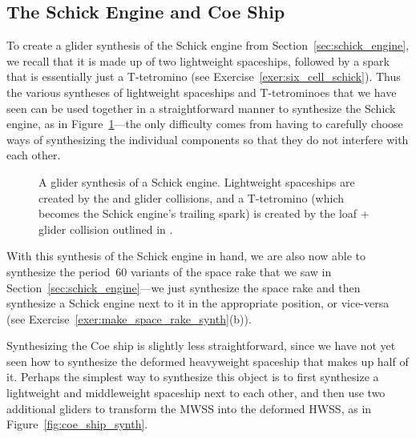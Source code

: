 \subsection{The Schick Engine and Coe Ship}\label{sec:incremental_schick}

To create a glider synthesis of the Schick engine from Section~\ref{sec:schick_engine}, we recall that it is made up of two lightweight spaceships, followed by a spark that is essentially just a T-tetromino (see Exercise~\ref{exer:six_cell_schick}). Thus the various syntheses of lightweight spaceships and T-tetrominoes that we have seen can be used together in a straightforward manner to synthesize the Schick engine, as in Figure~\ref{fig:schick_engine_synth}---the only difficulty comes from having to carefully choose ways of synthesizing the individual components so that they do not interfere with each other.

\begin{figure}[!ht]
	\centering
	
	\caption{A glider synthesis of a Schick engine. Lightweight spaceships are created by the  and  glider collisions, and a T-tetromino (which becomes the Schick engine's trailing spark) is created by the loaf + glider collision outlined in .}\label{fig:schick_engine_synth}
\end{figure}

With this synthesis of the Schick engine in hand, we are also now able to synthesize the period~$60$ variants of the space rake that we saw in Section~\ref{sec:schick_engine}---we just synthesize the space rake and then synthesize a Schick engine next to it in the appropriate position, or vice-versa (see Exercise~\ref{exer:make_space_rake_synth}(b)).

Synthesizing the Coe ship is slightly less straightforward, since we have not yet seen how to synthesize the deformed heavyweight spaceship that makes up half of it. Perhaps the simplest way to synthesize this object is to first synthesize a lightweight and middleweight spaceship next to each other, and then use two additional gliders to transform the MWSS into the deformed HWSS, as in Figure~\ref{fig:coe_ship_synth}.


